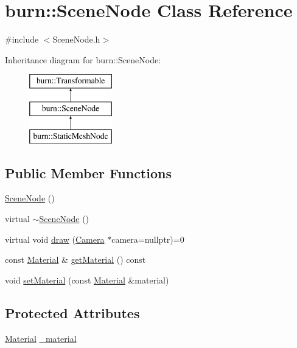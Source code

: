 \hypertarget{classburn_1_1_scene_node}{\section{burn\-:\-:Scene\-Node Class Reference}
\label{classburn_1_1_scene_node}
}


{\ttfamily \#include $<$Scene\-Node.\-h$>$}

Inheritance diagram for burn\-:\-:Scene\-Node\-:\begin{figure}[H]
\begin{center}
\leavevmode
\includegraphics[height=3.000000cm]{classburn_1_1_scene_node}
\end{center}
\end{figure}
\subsection*{Public Member Functions}
\begin{DoxyCompactItemize}
\item 
\hyperlink{classburn_1_1_scene_node_a107d42062677132d1104391fd2bf2530}{Scene\-Node} ()
\item 
virtual \hyperlink{classburn_1_1_scene_node_aa651409167ec065930115c8b31057e35}{$\sim$\-Scene\-Node} ()
\item 
virtual void \hyperlink{classburn_1_1_scene_node_adcea597571e59f15421c7a9ae0bfdbc3}{draw} (\hyperlink{classburn_1_1_camera}{Camera} $\ast$camera=nullptr)=0
\item 
const \hyperlink{classburn_1_1_material}{Material} \& \hyperlink{classburn_1_1_scene_node_a90bbe26a50c9039986bb60b52fd82a7d}{get\-Material} () const 
\item 
void \hyperlink{classburn_1_1_scene_node_a66ab4afa17f078a3814d4bbd88ed9ea1}{set\-Material} (const \hyperlink{classburn_1_1_material}{Material} \&material)
\end{DoxyCompactItemize}
\subsection*{Protected Attributes}
\begin{DoxyCompactItemize}
\item 
\hyperlink{classburn_1_1_material}{Material} \hyperlink{classburn_1_1_scene_node_a8474c310dafc48e860ebb5ed7ecc7f8f}{\-\_\-material}
\end{DoxyCompactItemize}


